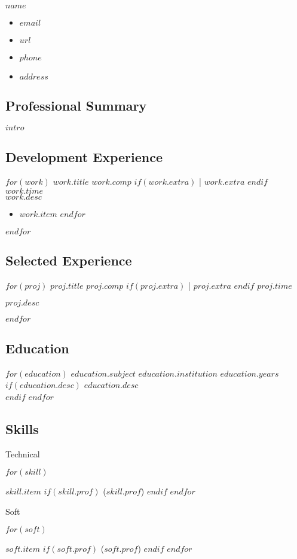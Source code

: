 \documentclass[$fontsize$, letter]{article}
\newcommand{\heading}[1]{
    \hrulefill \vspace{-0.5cm} \subsection*{{\color{gray} #1}}
}
\begin{document}
\begin{minipage}[t]{0.4\textwidth}
    {\Huge $name$}\\[.2cm]
\end{minipage}
\hfill
\begin{minipage}[b][2cm][b]{0.4\textwidth}
    \begin{itemize}[label={}, align=right]
        \item \hfill $email$
        \item \hfill \href{https://$url$}{$url$}
        \item \hfill $phone$
        \item \hfill $address$
    \end{itemize}
\end{minipage}

\heading{Professional Summary}
\begin{adjustwidth}{28pt}{0pt}
$intro$
\end{adjustwidth}

\heading{Development Experience}
$for(work)$
    {\Large $work.title$}
    {\small \color{gray}
    $work.comp$
    $if(work.extra)$ \big| $work.extra$ $endif$ \hspace*{\fill} $work.time$}
    \\
    $work.desc$
    \begin{itemize}
    $for(work.item)$
        \item $work.item$
    $endfor$
    \end{itemize}
$endfor$

\heading{Selected Experience}
$for(proj)$
    {\Large $proj.title$}
    {\small \color{gray}
    $proj.comp$
    $if(proj.extra)$ \big| $proj.extra$ $endif$ \hspace*{\fill} $proj.time$}
    \begin{adjustwidth}{0pt}{0pt}
    $proj.desc$\\
    \end{adjustwidth}

$endfor$
    
\heading{Education}
$for(education)$
    $education.subject$
    {\small {\color{gray}
    $education.institution$
    \hspace*{\fill} $education.years$}}\\
    $if(education.desc)$ $education.desc$\\ $endif$
    \vspace{-\baselineskip}
$endfor$

\heading{Skills}
{\color{gray} Technical}
\begin{commalist}
$for(skill)$
    \item $skill.item$ $if(skill.prof)$ ($skill.prof$) $endif$
$endfor$
\end{commalist}

{\color{gray} Soft}
\begin{commalist}
$for(soft)$
    \item $soft.item$ $if(soft.prof)$ {\color{gray}($soft.prof$)} $endif$
$endfor$
\end{commalist}
\end{document}
